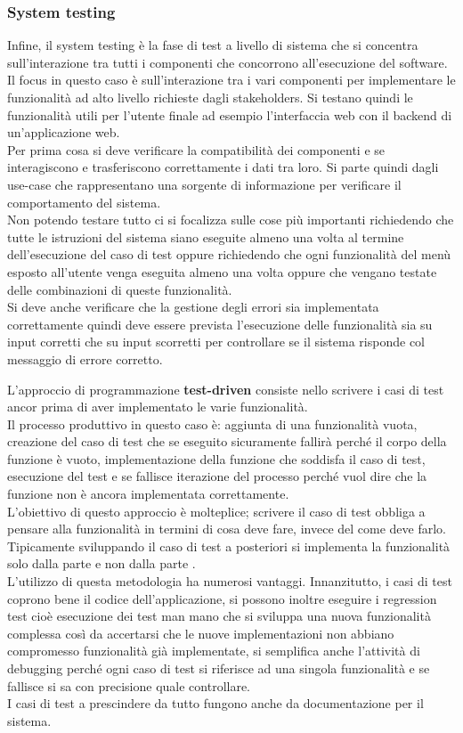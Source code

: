 \subsubsection{System testing}
Infine, il system testing è la fase di test a livello di sistema che si concentra sull'interazione tra tutti i componenti che concorrono all'esecuzione del software.
Il focus in questo caso è sull'interazione tra i vari componenti per implementare le funzionalità ad alto livello richieste dagli stakeholders.
Si testano quindi le funzionalità utili per l'utente finale ad esempio l'interfaccia web con il backend di un'applicazione web.\\
Per prima cosa si deve verificare la compatibilità dei componenti e se interagiscono e trasferiscono correttamente i dati tra loro.
Si parte quindi dagli use-case che rappresentano una sorgente di informazione per verificare il comportamento del sistema.\\
Non potendo testare tutto ci si focalizza sulle cose più importanti richiedendo che tutte le istruzioni del sistema siano eseguite almeno una volta al termine dell'esecuzione del caso di test oppure richiedendo che ogni funzionalità del menù esposto all'utente venga eseguita almeno una volta oppure che vengano testate delle combinazioni di queste funzionalità.\\
Si deve anche verificare che la gestione degli errori sia implementata correttamente quindi deve essere prevista l'esecuzione delle funzionalità sia su input corretti che su input scorretti per controllare se il sistema risponde col messaggio di errore corretto.

L'approccio di programmazione \textbf{test-driven} consiste nello scrivere i casi di test ancor prima di aver implementato le varie funzionalità.\\
Il processo produttivo in questo caso è: aggiunta di una funzionalità vuota, creazione del caso di test che se eseguito sicuramente fallirà perché il corpo della funzione è vuoto, implementazione della funzione che soddisfa il caso di test, esecuzione del test e se fallisce iterazione del processo perché vuol dire che la funzione non è ancora implementata correttamente.\\
L'obiettivo di questo approccio è molteplice; scrivere il caso di test obbliga a pensare alla funzionalità in termini di cosa deve fare, invece del come deve farlo.\\
Tipicamente sviluppando il caso di test a posteriori si implementa la funzionalità solo dalla parte  e non dalla parte .\\
L'utilizzo di questa metodologia ha numerosi vantaggi.
Innanzitutto, i casi di test coprono bene il codice dell'applicazione, si possono inoltre eseguire i regression test cioè esecuzione dei test man mano che si sviluppa una nuova funzionalità complessa così da accertarsi che le nuove implementazioni non abbiano compromesso funzionalità già implementate, si semplifica anche l'attività di debugging perché ogni caso di test si riferisce ad una singola funzionalità e se fallisce si sa con precisione quale controllare.\\
I casi di test a prescindere da tutto fungono anche da documentazione per il sistema.

